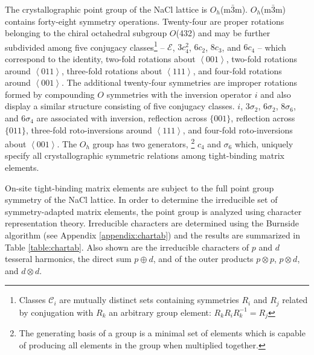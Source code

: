 \documentclass[twocolumn,showpacs,preprintnumbers,superscriptaddress,prb,floatfix,aps,10pt]{revtex4-1}
\newcommand*{\class}{\mathcal{C}}
\newcommand*{\id}{\mathcal{E}}
\begin{document}
The crystallographic point group of the NaCl lattice is $O_h$(m$\bar{3}$m). $O_h$(m$\bar{3}$m) contains forty-eight symmetry operations. Twenty-four are proper rotations belonging to the chiral octahedral subgroup $O$(432) and may be further subdivided among five conjugacy classes\footnote{Classes $\class_i$ are mutually distinct sets containing symmetries $R_i$ and $R_j$ related by conjugation with $R_k$ an arbitrary group element: $R_kR_iR_k^{-1}=R_j$} --  $\id$, $3c_4^2$, $6c_2$, $8c_3$, and $6c_4$ -- which correspond to the identity, two-fold rotations about $\left<001\right>$, two-fold rotations around $\left<011\right>$, three-fold rotations about $\left<111\right>$, and four-fold rotations around $\left<001\right>$. The additional twenty-four symmetries are improper rotations formed by compounding $O$ symmetries with the inversion operator $i$ and also display a similar structure consisting of five conjugacy classes. $i$, $3\sigma_2$, $6\sigma_2$, $8\sigma_6$, and $6\sigma_4$ are associated with inversion, reflection across $\{001\}$, reflection across $\{011\}$, three-fold roto-inversions around $\left<111\right>$, and four-fold roto-inversions about $\left<001\right>$. The $O_h$ group has two generators, \footnote{The generating basis of a group is a minimal set of elements which is capable of producing all elements in the group when multiplied together.} $c_4$ and $\sigma_6$ which, uniquely specify all crystallographic symmetric relations among tight-binding matrix elements.

On-site tight-binding matrix elements are subject to the full point group symmetry of the NaCl lattice. In order to determine the irreducible set of symmetry-adapted matrix elements, the point group is analyzed using character representation theory. Irreducible characters are determined using the Burnside algorithm (see Appendix \ref{appendix:chartab}) and the results are summarized in Table \ref{table:chartab}. Also shown are the irreducible characters of $p$ and $d$ tesseral harmonics, the direct sum $p \oplus d$, and of the outer products $p \otimes p$, $p \otimes d$, and $d \otimes d$. 
\end{document}
